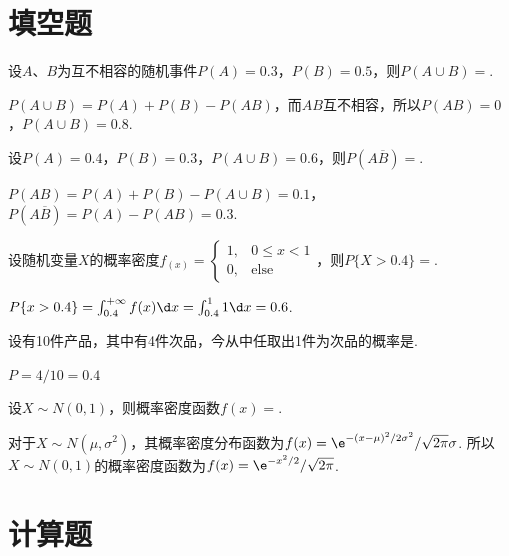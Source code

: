 \section{填空题}

\begin{problem}
    设$A$、$B$为互不相容的随机事件$P(A)=0.3$，$P(B)=0.5$，则$P(A\cup B)=$.
\end{problem}
\begin{solution}
    $P(A\cup B)=P(A)+P(B)-P(AB)$，而$AB$互不相容，所以$P(AB)=0$，$P(A\cup B)=0.8$.
\end{solution}

\begin{problem}
    设$P(A)=0.4$，$P(B)=0.3$，$P(A\cup B)=0.6$，则$P(A\overline B)=$.
\end{problem}
\begin{solution}
    $P(AB)=P(A)+P(B)-P(A\cup B)=0.1$，$P(A\overline B)=P(A)-P(AB)=0.3$.
\end{solution}

\begin{problem}
    设随机变量$X$的概率密度$f_(x)=\begin{cases}
        1, & 0\leq x<1\\0, & \text{else}
    \end{cases}$，则$P\{X>0.4\}=$.
\end{problem}
\begin{solution}
    $P\{x>0.4\}=\int_{0.4}^{+\infty}f(x)\d x=\int_{0.4}^11\d x=0.6$.
\end{solution}

\begin{problem}
    设有10件产品，其中有4件次品，今从中任取出1件为次品的概率是.
\end{problem}
\begin{solution}
    $P=4/10=0.4$
\end{solution}

\begin{problem}
    设$X\sim N(0,1)$，则概率密度函数$f(x)=$.
\end{problem}
\begin{solution}
    对于$X\sim N(\mu,\sigma^2)$，其概率密度分布函数为$f(x)=\e^{-(x-\mu)^2/2\sigma^2}/\sqrt{2\pi}\sigma$. 所以$X\sim N(0,1)$的概率密度函数为$f(x)=\e^{-x^2/2}/\sqrt{2\pi}$.
\end{solution}

\section{计算题}

